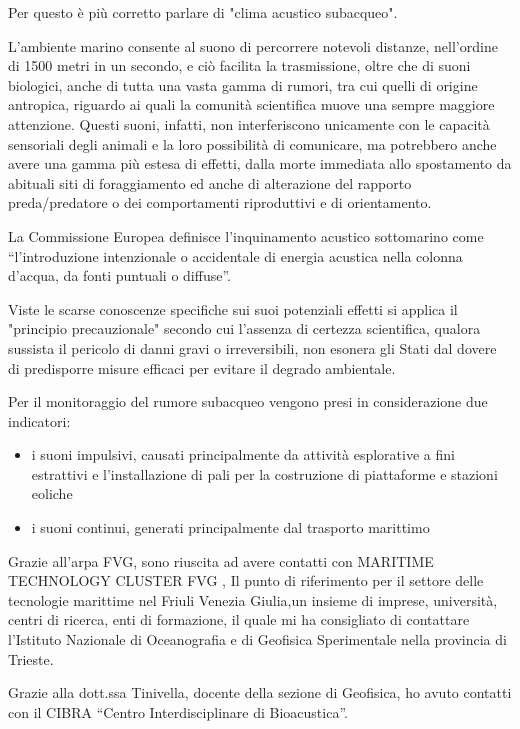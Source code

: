 Per questo è più corretto parlare di "clima acustico subacqueo". 

L’ambiente marino consente al suono di percorrere notevoli distanze, nell’ordine di 1500 metri in un secondo, e ciò facilita la trasmissione, oltre che di suoni biologici, anche di tutta una vasta gamma di rumori, tra cui quelli di origine antropica, riguardo ai quali la comunità scientifica muove una sempre maggiore attenzione. 
Questi suoni, infatti, non interferiscono unicamente con le capacità sensoriali degli animali e la loro possibilità di comunicare, ma potrebbero anche avere una gamma più estesa di effetti, dalla morte immediata allo spostamento da abituali siti di foraggiamento ed anche di alterazione del rapporto preda/predatore o dei comportamenti riproduttivi e di orientamento. 

La Commissione Europea definisce l’inquinamento acustico sottomarino come “l’introduzione intenzionale o accidentale di energia acustica nella colonna d’acqua, da fonti puntuali o diffuse”.

Viste le scarse conoscenze specifiche sui suoi potenziali effetti si applica il "principio precauzionale" secondo cui l’assenza di certezza scientifica, qualora sussista il pericolo di danni gravi o irreversibili, non esonera gli Stati dal dovere di predisporre misure efficaci per evitare il degrado ambientale.

Per il monitoraggio del rumore subacqueo vengono presi in considerazione due indicatori:

\begin{itemize}
\item i suoni impulsivi, causati principalmente da attività esplorative a fini estrattivi e l’installazione di pali per la costruzione di piattaforme e stazioni eoliche
\item i suoni continui, generati principalmente dal trasporto marittimo
\end{itemize}

Grazie all'arpa FVG, sono riuscita ad avere contatti con MARITIME TECHNOLOGY CLUSTER FVG , Il punto di riferimento per il settore delle tecnologie marittime nel Friuli Venezia Giulia,un insieme di imprese, università, centri di ricerca, enti di formazione, il quale mi ha consigliato di contattare l'Istituto Nazionale di Oceanografia e di Geofisica Sperimentale nella provincia di Trieste. 

Grazie alla dott.ssa Tinivella, docente della sezione di Geofisica, ho avuto contatti con il CIBRA “Centro Interdisciplinare di Bioacustica”. 

